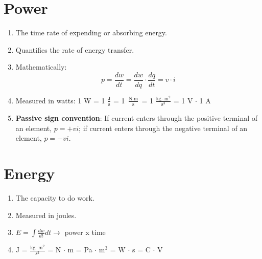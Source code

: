 \documentclass[11pt]{book}
\begin{document}
\section{Power}
\begin{enumerate}
	\item The time rate of expending or absorbing energy.
	\item Quantifies the rate of energy transfer.
	\item Mathematically:
	\begin{equation}
		p = \frac{dw}{dt} = \frac{dw}{dq}\cdot\frac{dq}{dt} = v\cdot i
	\end{equation}
	\item Measured in watts: 1 W = 1 $\frac{\text{J}}{\text{s}}$ = 1 $\frac{\text{N}\cdot \text{m}}{\text{s}}$ = 1 $\frac{\text{kg}\cdot \text{m}^2}{\text{s}^3}$ = 1 V $\cdot$ 1 A
	\item \textbf{Passive sign convention}: If current enters through the positive terminal of an element, $p = +vi$; if current enters through the negative terminal of an element, $p = -vi$.
\end{enumerate}



\section{Energy}
\begin{enumerate}
	\item The capacity to do work.
	\item Measured in joules.
	\item $E = \int\frac{dw}{dt}dt \rightarrow$ power x time
	\item J = $\frac{\text{kg}\cdot\text{m}^2}{\text{s}^2}$ = N $\cdot$ m = Pa $\cdot$ m$^3$ = W $\cdot$ s = C $\cdot$ V
\end{enumerate}
\end{document}
